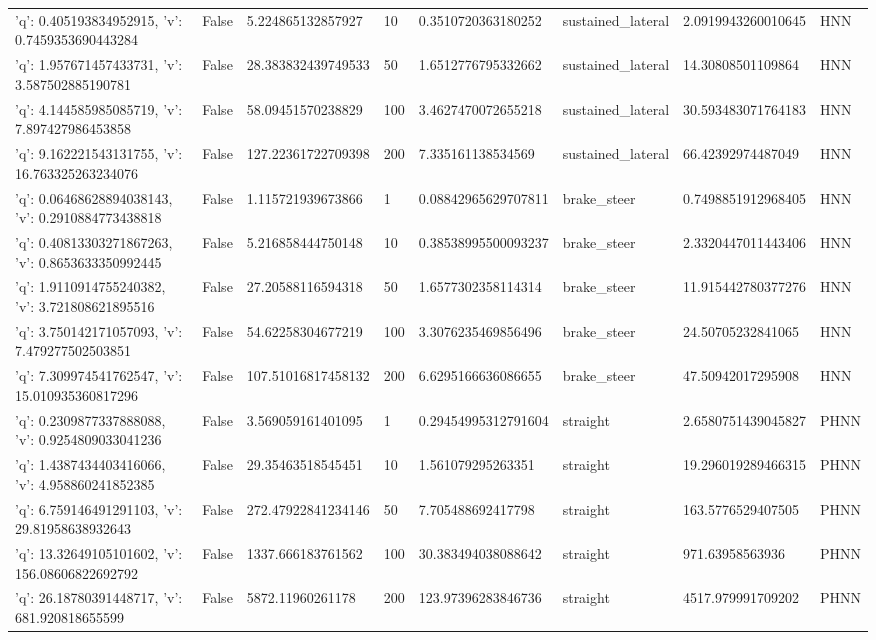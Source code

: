 \begin{tabular}{llllllll}
{'q': 0.405193834952915, 'v': 0.7459353690443284} & False & 5.224865132857927 & 10 & 0.3510720363180252 & sustained\_lateral & 2.0919943260010645 & HNN \\
{'q': 1.957671457433731, 'v': 3.587502885190781} & False & 28.383832439749533 & 50 & 1.6512776795332662 & sustained\_lateral & 14.30808501109864 & HNN \\
{'q': 4.144585985085719, 'v': 7.897427986453858} & False & 58.09451570238829 & 100 & 3.4627470072655218 & sustained\_lateral & 30.593483071764183 & HNN \\
{'q': 9.162221543131755, 'v': 16.763325263234076} & False & 127.22361722709398 & 200 & 7.335161138534569 & sustained\_lateral & 66.42392974487049 & HNN \\
{'q': 0.06468628894038143, 'v': 0.2910884773438818} & False & 1.115721939673866 & 1 & 0.08842965629707811 & brake\_steer & 0.7498851912968405 & HNN \\
{'q': 0.40813303271867263, 'v': 0.8653633350992445} & False & 5.216858444750148 & 10 & 0.38538995500093237 & brake\_steer & 2.3320447011443406 & HNN \\
{'q': 1.9110914755240382, 'v': 3.721808621895516} & False & 27.20588116594318 & 50 & 1.6577302358114314 & brake\_steer & 11.915442780377276 & HNN \\
{'q': 3.750142171057093, 'v': 7.479277502503851} & False & 54.62258304677219 & 100 & 3.3076235469856496 & brake\_steer & 24.50705232841065 & HNN \\
{'q': 7.309974541762547, 'v': 15.010935360817296} & False & 107.51016817458132 & 200 & 6.6295166636086655 & brake\_steer & 47.50942017295908 & HNN \\
{'q': 0.2309877337888088, 'v': 0.9254809033041236} & False & 3.569059161401095 & 1 & 0.29454995312791604 & straight & 2.6580751439045827 & PHNN \\
{'q': 1.4387434403416066, 'v': 4.958860241852385} & False & 29.35463518545451 & 10 & 1.561079295263351 & straight & 19.296019289466315 & PHNN \\
{'q': 6.759146491291103, 'v': 29.81958638932643} & False & 272.47922841234146 & 50 & 7.705488692417798 & straight & 163.5776529407505 & PHNN \\
{'q': 13.32649105101602, 'v': 156.08606822692792} & False & 1337.666183761562 & 100 & 30.383494038088642 & straight & 971.63958563936 & PHNN \\
{'q': 26.18780391448717, 'v': 681.920818655599} & False & 5872.11960261178 & 200 & 123.97396283846736 & straight & 4517.979991709202 & PHNN \\

\end{tabular}
